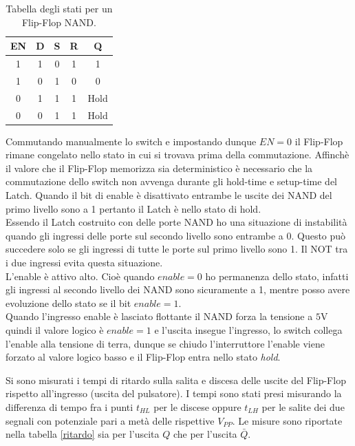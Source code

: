 \documentclass[10pt,a4paper]{article}
\begin{document}
\begin{table}[!htb]
\centering
\begin{tabular}{|c|c|c|c|c|}
\hline 
EN & D & S & R & Q\\ 
\hline 
1 & 1 & 0 & 1 & 1\\ 
\hline 
1 & 0 & 1 & 0 & 0\\ 
\hline 
0 & 1 & 1 & 1 & Hold\\ 
\hline 
0 & 0 & 1 & 1 & Hold\\ 
\hline 
\end{tabular}
\caption{Tabella degli stati per un Flip-Flop NAND. \label{stati2}}
\end{table}


Commutando manualmente lo switch e impostando dunque $EN = 0$ il Flip-Flop rimane congelato nello stato in cui si trovava prima della commutazione.
Affinchè il valore che il Flip-Flop memorizza sia deterministico è necessario che la commutazione dello switch non avvenga durante gli hold-time e setup-time del Latch. Quando il bit di enable è disattivato entrambe le uscite dei NAND del primo livello sono a 1 pertanto il Latch è nello stato di hold.\\

Essendo il Latch costruito con delle porte NAND ho una situazione di instabilità quando gli ingressi delle porte sul secondo livello sono entrambe a 0. Questo può succedere solo se gli ingressi di tutte le porte sul primo livello sono 1. Il NOT tra i due ingressi evita questa situazione.\\
L'enable è attivo alto. Cioè quando $enable = 0$ ho permanenza dello stato, infatti gli ingressi al secondo livello dei NAND sono sicuramente a 1, mentre posso avere evoluzione dello stato se il bit $enable = 1$.\\
Quando l'ingresso enable è lasciato flottante il NAND forza la tensione a $5$V quindi il valore logico è   $enable = 1$ e l'uscita insegue l'ingresso, lo switch collega l'enable alla tensione di terra, dunque se chiudo l'interruttore l'enable viene forzato al valore logico basso e il Flip-Flop entra nello stato \emph{hold}.%

Si sono misurati i tempi di ritardo sulla salita e discesa delle uscite del Flip-Flop rispetto all'ingresso (uscita del pulsatore). I tempi sono stati presi misurando la differenza di tempo fra i punti $t_{HL}$ per le discese oppure $t_{LH}$ per le salite dei due segnali con potenziale pari a metà delle rispettive $V_{PP}$. Le misure sono riportate nella tabella \ref{ritardo} sia per l'uscita $Q$ che per l'uscita $\bar{Q}$.
\end{document}
